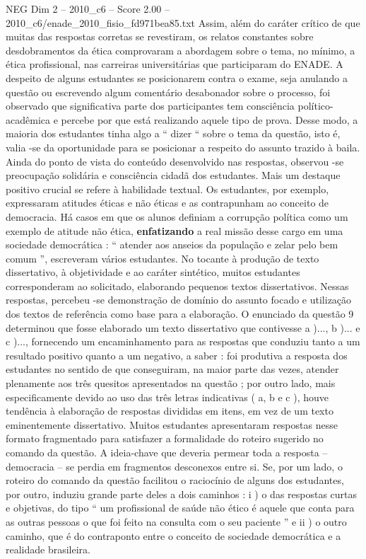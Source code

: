 \begin{textsample}{NEG Dim 2 – 2010\_c6 – Score 2.00 – 2010\_c6/enade\_2010\_fisio\_fd971bea85.txt}
Assim, além do caráter crítico de que muitas das respostas corretas se revestiram, os relatos constantes sobre desdobramentos da ética comprovaram a abordagem sobre o tema, no mínimo, a ética profissional, nas carreiras universitárias que participaram do ENADE.
A despeito de alguns estudantes se posicionarem contra o exame, seja anulando a questão ou escrevendo algum comentário desabonador sobre o processo, foi observado que significativa parte dos participantes tem consciência político-acadêmica e percebe por que está realizando aquele tipo de prova.
Desse modo, a maioria dos estudantes tinha algo a “ dizer “ sobre o tema da questão, isto é, valia -se da oportunidade para se posicionar a respeito do assunto trazido à baila.
Ainda do ponto de vista do conteúdo desenvolvido nas respostas, observou -se preocupação solidária e consciência cidadã dos estudantes.
Mais um destaque positivo crucial se refere à habilidade textual.
Os estudantes, por exemplo, expressaram atitudes éticas e não éticas e as contrapunham ao conceito de democracia.
Há casos em que os alunos definiam a corrupção política como um exemplo de atitude não ética, \textbf{enfatizando} a real missão desse cargo em uma sociedade democrática : “ atender aos anseios da população e zelar pelo bem comum ”, escreveram vários estudantes.
No tocante à produção de texto dissertativo, à objetividade e ao caráter sintético, muitos estudantes corresponderam ao solicitado, elaborando pequenos textos dissertativos.
Nessas respostas, percebeu -se demonstração de domínio do assunto focado e utilização dos textos de referência como base para a elaboração.
O enunciado da questão 9 determinou que fosse elaborado um texto dissertativo que contivesse a )..., b )... e c )..., fornecendo um encaminhamento para as respostas que conduziu tanto a um resultado positivo quanto a um negativo, a saber : foi produtiva a resposta dos estudantes no sentido de que conseguiram, na maior parte das vezes, atender plenamente aos três quesitos apresentados na questão ; por outro lado, mais especificamente devido ao uso das três letras indicativas ( a, b e c ), houve tendência à elaboração de respostas divididas em itens, em vez de um texto eminentemente dissertativo.
Muitos estudantes apresentaram respostas nesse formato fragmentado para satisfazer a formalidade do roteiro sugerido no comando da questão.
A ideia-chave que deveria permear toda a resposta – democracia – se perdia em fragmentos desconexos entre si.
Se, por um lado, o roteiro do comando da questão facilitou o raciocínio de alguns dos estudantes, por outro, induziu grande parte deles a dois caminhos : i ) o das respostas curtas e objetivas, do tipo “ um profissional de saúde não ético é aquele que conta para as outras pessoas o que foi feito na consulta com o seu paciente ” e ii ) o outro caminho, que é do contraponto entre o conceito de sociedade democrática e a realidade brasileira.

\end{textsample}
